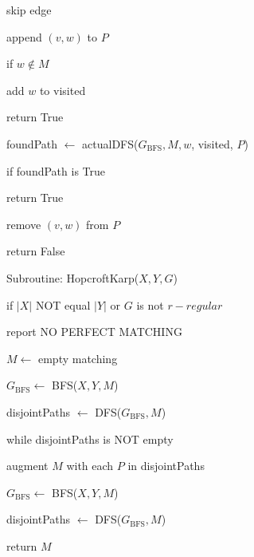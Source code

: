 \documentclass{article}
\begin{document}
\hspace{3cm} skip edge

\hspace{2cm} append $(v, w)$ to $P$

\hspace{2cm} if $w \notin M$

\hspace{3cm} add $w$ to visited

\hspace{3cm} return True

\hspace{2cm} foundPath $\leftarrow$ actualDFS($G_{\mathrm{BFS}}, M, w$, visited, $P$)

\hspace{2cm} if foundPath is True

\hspace{3cm} return True

\hspace{2cm} remove $(v, w)$ from $P$

\hspace{1cm} return False

\vspace{0.5cm}

Subroutine: HopcroftKarp($X, Y, G$) \dotfill

\hspace{1cm} if $|X|$ NOT equal $|Y|$ or $G$ is not $r-regular$

\hspace{2cm} report NO PERFECT MATCHING

\hspace{1cm} $M \leftarrow$ empty matching

\hspace{1cm} $G_{\mathrm{BFS}} \leftarrow$ BFS($X, Y, M$)

\hspace{1cm} disjointPaths $\leftarrow$ DFS($G_{\mathrm{BFS}}, M$)

\hspace{1cm} while disjointPaths is NOT empty

\hspace{2cm} augment $M$ with each $P$ in disjointPaths

\hspace{2cm} $G_{\mathrm{BFS}} \leftarrow$ BFS($X, Y, M$)

\hspace{2cm} disjointPaths $\leftarrow$ DFS($G_{\mathrm{BFS}}, M$)

\hspace{1cm} return $M$
\end{document}
